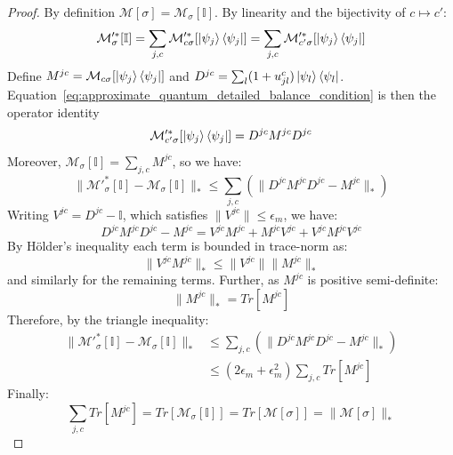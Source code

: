 \documentclass[aps,floatfix,10pt,amssymb,amsfont,amsmath,superscriptaddress,float,nofootinbib,longbibliography,nobalancelastpage,twocolumn]{revtex4-2}
\begin{document}
\begin{proof}
    By definition $\mathcal{M}[\sigma]=\mathcal{M}_{\sigma}[\mathbb{I}]$. By linearity and the bijectivity of $c \mapsto c'$:
    \begin{equation}
        \mathcal{M}'^*_{\sigma}[\mathbb{I}] = \sum_{j,c}\mathcal{M}'^*_{c\sigma}[\ket{\psi_j}\bra{\psi_j}] = \sum_{j,c}\mathcal{M}'^*_{c'\sigma}[\ket{\psi_j}\bra{\psi_j}]
    \end{equation}
    Define $M^{jc} = \mathcal{M}_{c\sigma}[\ket{\psi_j}\bra{\psi_j}]$ and $D^{jc}=\sum_l(1+u_{jl}^{c})\ket{\psi_l}\bra{\psi_l}$. Equation~\eqref{eq:approximate_quantum_detailed_balance_condition} is then the operator identity 
    \begin{equation}
        \mathcal{M}'^*_{c'\sigma}[\ket{\psi_j}\bra{\psi_j}]=D^{jc}M^{jc}D^{jc}
    \end{equation}
    Moreover, $\mathcal{M}_{\sigma}[\mathbb{I}] = \sum_{j,c}M^{jc}$, so we have:
    \begin{equation}
        \|\mathcal{M}'^*_{\sigma}[\mathbb{I}]-\mathcal{M}_\sigma[\mathbb{I}]\|_* \leq \sum_{j,c}\left(\|D^{jc}M^{jc}D^{jc}-M^{jc}\|_*\right)
    \end{equation}
    Writing $V^{jc} = D^{jc}-\mathbb{I}$, which satisfies $\|V^{jc}\|\leq\epsilon_m$, we have:
    \begin{equation}
        D^{jc}M^{jc}D^{jc} - M^{jc} = V^{jc}M^{jc} + M^{jc}V^{jc} + V^{jc}M^{jc}V^{jc}
    \end{equation}
    By H\"older's inequality each term is bounded in trace-norm as:
    \begin{equation}
        \|V^{jc}M^{jc}\|_* \leq \|V^{jc}\|\|M^{jc}\|_*
    \end{equation}
    and similarly for the remaining terms. Further, as $M^{jc}$ is positive semi-definite:
    \begin{equation}
       \|M^{jc}\|_* = Tr[M^{jc}]
    \end{equation}
    Therefore, by the triangle inequality:
    \begin{align}
        \|\mathcal{M}'^*_{\sigma}[\mathbb{I}]-\mathcal{M}_\sigma[\mathbb{I}]\|_* &\leq \sum_{j,c}\left(\|D^{jc}M^{jc}D^{jc}-M^{jc}\|_*\right)\\
        &\leq (2\epsilon_m+\epsilon_m^2)\sum_{j,c}Tr[M^{jc}] 
    \end{align}
    Finally:
    \begin{equation}
        \sum_{j,c}Tr[M^{jc}] = Tr[\mathcal{M}_{\sigma}[\mathbb{I}]] = Tr[\mathcal{M}[\sigma]] = \|\mathcal{M}[\sigma]\|_*
    \end{equation}
\end{proof}
\end{document}
